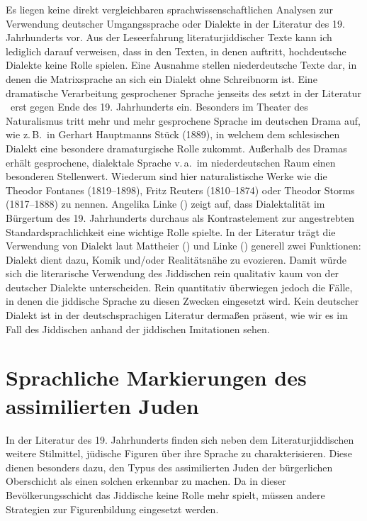   
Es liegen keine direkt vergleichbaren sprachwissenschaftlichen Analysen zur Verwendung deutscher Umgangssprache oder Dialekte in der Literatur des 19. Jahrhunderts vor. Aus der Leseerfahrung literaturjiddischer Texte kann ich lediglich darauf verweisen, dass in den Texten, in denen \hai{{\LiJi}} auftritt, hochdeutsche Dialekte keine Rolle spielen. Eine Ausnahme stellen niederdeutsche Texte dar, in denen die Matrixsprache an sich ein Dialekt ohne Schreibnorm ist. Eine dramatische Verarbeitung gesprochener Sprache jenseits des \hai{{\LiJi}} setzt in der Literatur \,%
erst gegen Ende des 19. Jahrhunderts ein. Besonders im Theater des Naturalismus tritt mehr und mehr gesprochene Sprache im deutschen Drama auf, wie z.\,B.\, in Gerhart Hauptmanns Stück  (1889), in welchem dem schlesischen Dialekt eine besondere dramaturgische Rolle zukommt. Außerhalb des Dramas erhält gesprochene, dialektale Sprache v.\,a.\, im niederdeutschen Raum einen besonderen Stellenwert. Wiederum sind hier naturalistische Werke wie die  Theodor Fontanes (1819–1898), Fritz Reuters (1810–1874) oder Theodor Storms (1817–1888) zu nennen. Angelika Linke (\citeyear[231--264]{Linke1996}) zeigt auf, dass Dialektalität im Bürgertum des 19. Jahrhunderts durchaus als Kontrastelement zur angestrebten Standardsprachlichkeit eine wichtige Rolle spielte. In der Literatur trägt die Verwendung von Dialekt laut Mattheier (\citeyear{Mattheier1993}) und Linke (\citeyear[239f]{Linke1996}) generell zwei Funktionen: Dialekt dient dazu, Komik und/oder Realitätsnähe zu evozieren. Damit würde sich die literarische Verwendung des Jiddischen rein qualitativ kaum von der deutscher Dialekte unterscheiden. Rein quantitativ überwiegen jedoch die Fälle, in denen die jiddische Sprache zu diesen Zwecken eingesetzt wird.  Kein deutscher Dialekt ist in der deutschsprachigen Literatur dermaßen präsent, wie wir es im Fall des Jiddischen anhand der jiddischen Imitationen sehen. 


\section{Sprachliche Markierungen des assimilierten Juden}\label{assimiliert}
 
In der Literatur des 19. Jahrhunderts finden sich neben dem Literaturjiddischen weitere Stilmittel, jüdische Figuren über ihre Sprache zu charakterisieren. Diese dienen besonders dazu, den Typus des assimilierten Juden der bürgerlichen Oberschicht  als einen solchen erkennbar zu machen. Da in dieser Bevölkerungsschicht das Jiddische keine Rolle mehr spielt, müssen andere Strategien zur Figurenbildung eingesetzt werden. 
 
